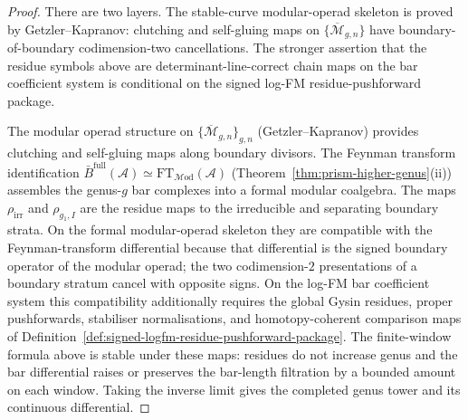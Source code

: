 \begin{proof}
There are two layers.  The stable-curve modular-operad skeleton is
proved by Getzler--Kapranov: clutching and self-gluing maps on
$\{\overline{\mathcal M}_{g,n}\}$ have boundary-of-boundary
codimension-two cancellations.  The stronger assertion that the
residue symbols above are determinant-line-correct chain maps on the
bar coefficient system is conditional on the signed log-FM
residue-pushforward package.

The modular operad structure on
$\{\overline{\mathcal{M}}_{g,n}\}_{g,n}$ (Getzler--Kapranov)
provides clutching and self-gluing maps along boundary divisors.
The Feynman transform identification
$\bar{B}^{\mathrm{full}}(\mathcal{A}) \simeq
\mathrm{FT}_{\mathcal{M}\mathrm{od}}(\mathcal{A})$
(Theorem~\ref{thm:prism-higher-genus}(ii)) assembles the
genus-$g$ bar complexes into a formal modular coalgebra. The maps
$\rho_{\mathrm{irr}}$ and $\rho_{g_1,I}$ are the residue maps to
the irreducible and separating boundary strata.  On the formal
modular-operad skeleton they are compatible with the Feynman-transform
differential because that differential is the signed boundary operator
of the modular operad; the two codimension-$2$ presentations of a
boundary stratum cancel with opposite signs.  On the log-FM bar
coefficient system this compatibility additionally requires the global
Gysin residues, proper pushforwards, stabiliser normalisations, and
homotopy-coherent comparison maps of
Definition~\ref{def:signed-logfm-residue-pushforward-package}.
The finite-window formula above is stable under these maps: residues
do not increase genus and the bar differential raises or preserves the
bar-length filtration by a bounded amount on each window. Taking the
inverse limit gives the completed genus tower and its continuous
differential.
\end{proof}

